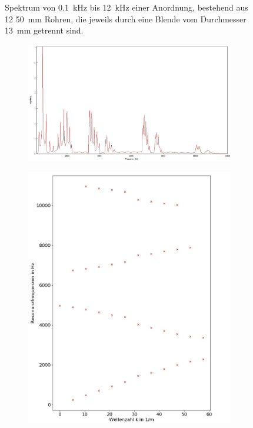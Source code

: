 \begin{figure}
\begin{subfigure}{0.34\textwidth}
\end{subfigure}
\caption{Spektrum von 0.1~kHz bis 12~kHz einer Anordnung, bestehend aus 12 50~mm Rohren, die jeweils durch eine Blende vom Durchmesser 13~mm getrennt sind.}
\label{fig:4b_5_12}
\end{figure}
\begin{figure}
\centering
\begin{subfigure}{0.65\textwidth}
\includegraphics[width=\textwidth]{content/messungen/Chapter4b/4b_5_12_alternating.jpg}
\end{subfigure}
\begin{subfigure}{0.34\textwidth}
\includegraphics[width=\textwidth]{content/Scripts/4b_5_alt_red.jpg}

\end{subfigure}
\end{figure}
